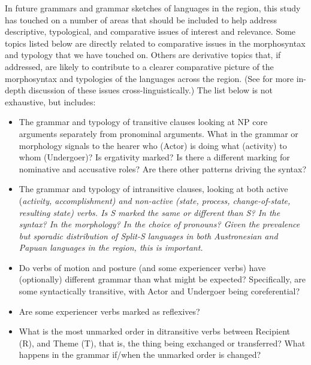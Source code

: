 In future grammars
and grammar sketches of languages in the region,
this study has touched on a number of areas that should be included
to help address descriptive,
typological, and comparative issues of interest and relevance.
Some topics listed below are directly related to comparative
issues in the morphosyntax
and typology that we have touched on.
Others are derivative topics that,
if addressed, are likely to contribute to a clearer comparative
picture of the morphosyntax
and typologies of the languages across the region.
(See \citealp{Payne1997,Dixon2010} for more in-depth discussion
of these issues cross-linguistically.) The list below is not
exhaustive, but includes:

\begin{itemize}
	\item	The grammar
				and typology of transitive clauses looking at NP core arguments
				separately from pronominal arguments.
				What in the grammar or morphology signals to the hearer who (Actor)
				is doing what (activity) to whom (Undergoer)? Is ergativity marked?
				Is there a different marking for nominative
				and accusative roles? Are there other patterns driving the syntax?

	\item	The grammar
				and typology of intransitive clauses,
				looking at both active (\it{activity,
				accomplishment}) and non-active (\it{state, process,
				change-of-state, resulting state}) verbs.
				Is S marked the same or different than S? In the syntax? In
				the morphology? In the choice of pronouns? Given the prevalence
				but sporadic distribution of Split-S languages in both Austronesian
				and Papuan languages in the region, this is important.

	\item	Do verbs of motion
				and posture (and some experiencer verbs) have (optionally) different
				grammar than what might be expected? Specifically,
				are some syntactically transitive,
				with Actor and Undergoer being coreferential?

	\item	Are some experiencer verbs marked as reflexives?

	\item	What is the most unmarked order in ditransitive verbs between
				Recipient (R), and Theme (T), that is,
				the thing being exchanged or transferred? What happens in the
				grammar if/when the unmarked order is changed?


\end{itemize}
